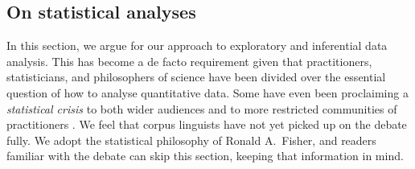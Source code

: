 \appendix
\subsection{On statistical analyses}
\label{sec:onstatisticalanalyses}

In this section, we argue for our approach to exploratory and inferential data analysis.
This has become a de facto requirement given that practitioners, statisticians, and philosophers of science have been divided over the essential question of how to analyse quantitative data.
Some have even been proclaiming a \textit{statistical crisis} to both wider audiences \parencite{GelmanLoken2014} and to more restricted communities of practitioners \parencite{GelmanGeurts2017}.
We feel that corpus linguists have not yet picked up on the debate fully.
We adopt the statistical philosophy of Ronald A.\ Fisher, and readers familiar with the debate can skip this section, keeping that information in mind.

